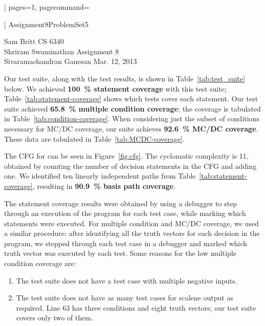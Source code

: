 \documentclass{article}
\newcommand\codefamily{\ttfamily}  %
\newcommand\code[1]{\text{\codefamily #1}}
\newcommand\coverage[2]{\textbf{\SI[detect-weight]{#1}{\percent} #2}}
\begin{document}
\thispagestyle{empty}


  [
    pages=1,
    pagecommand=
      {
      }
  ]
  {Assignment8ProblemSet5}

\clearpage
{}

\noindent
Sam Britt                \hfill CS 6340      \\
Shriram Swaminathan      \hfill Assignment 8 \\
Sivaramachandran Ganesan \hfill Mar. 12, 2013

Our test suite, along with the test results, is shown in
Table~\ref{tab:test_suite} below. We achieved \coverage{100}{statement
coverage} with this test suite; Table~\ref{tab:statement-coverage}
shows which tests cover each statement. Our test suite achieved
\coverage{65.8}{multiple condition coverage}; the coverage is
tabulated in Table~\ref{tab:condition-coverage}.  When considering
just the subset of conditions necessary for MC/DC coverage, our suite
achieves \coverage{92.6}{MC/DC coverage}. These data are tabulated in
Table~\ref{tab:MCDC-coverage}.

The CFG for \code{tritype.c} can be seen in Figure~\ref{fig:cfg}. The
cyclomatic complexity is 11, obtained by counting the number of
decision statements in the CFG and adding one. We identified ten
linearly independent paths from Table~\ref{tab:statement-coverage},
resulting in \coverage{90.9}{basis path coverage}.

The statement coverage results were obtained by using a debugger to
step through an execution of the program for each test case, while
marking which statements were executed. For multiple condition and
MC/DC coverage, we used a similar procedure: after identifying all the
truth vectors for each decision in the program, we stepped through
each test case in a debugger and marked which truth vector was
executed by each test. Some reasons for the low multiple condition
coverage are:
\begin{enumerate}
  \item The test suite does not have a test case with multiple
    negative inputs.
  \item The test suite does not have as many test cases for scalene
    output as required. Line 63 has three conditions and eight truth
    vectors; our test suite covers only two of them.
\end{enumerate}
\end{document}
